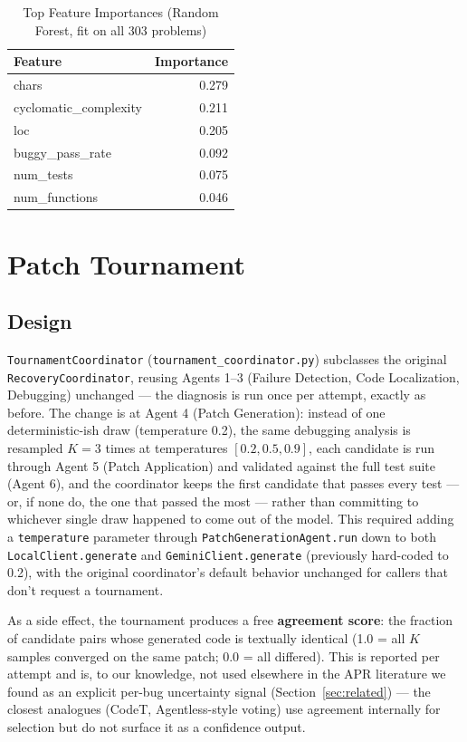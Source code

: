 \documentclass[conference]{IEEEtran}
\begin{document}
\begin{table}[h]
\centering
\caption{Top Feature Importances (Random Forest, fit on all 303 problems)}
\label{tab:importances}
\begin{tabular}{@{}lr@{}}
\toprule
Feature & Importance \\
\midrule
chars                    & 0.279 \\
cyclomatic\_complexity   & 0.211 \\
loc                      & 0.205 \\
buggy\_pass\_rate        & 0.092 \\
num\_tests               & 0.075 \\
num\_functions           & 0.046 \\
\bottomrule
\end{tabular}
\end{table}

\section{Patch Tournament}
\label{sec:tournament}

\subsection{Design}
\texttt{TournamentCoordinator} (\texttt{tournament\_coordinator.py}) subclasses the original \texttt{RecoveryCoordinator}, reusing Agents 1--3 (Failure Detection, Code Localization, Debugging) unchanged — the diagnosis is run once per attempt, exactly as before. The change is at Agent 4 (Patch Generation): instead of one deterministic-ish draw (temperature 0.2), the same debugging analysis is resampled $K{=}3$ times at temperatures $[0.2, 0.5, 0.9]$, each candidate is run through Agent 5 (Patch Application) and validated against the full test suite (Agent 6), and the coordinator keeps the first candidate that passes every test — or, if none do, the one that passed the most — rather than committing to whichever single draw happened to come out of the model. This required adding a \texttt{temperature} parameter through \texttt{PatchGenerationAgent.run} down to both \texttt{LocalClient.generate} and \texttt{GeminiClient.generate} (previously hard-coded to 0.2), with the original coordinator's default behavior unchanged for callers that don't request a tournament.

As a side effect, the tournament produces a free \textbf{agreement score}: the fraction of candidate pairs whose generated code is textually identical (1.0 = all $K$ samples converged on the same patch; 0.0 = all differed). This is reported per attempt and is, to our knowledge, not used elsewhere in the APR literature we found as an explicit per-bug uncertainty signal (Section~\ref{sec:related}) — the closest analogues (CodeT, Agentless-style voting) use agreement internally for selection but do not surface it as a confidence output.
\end{document}
